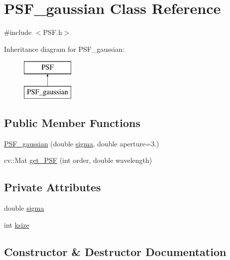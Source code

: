 \hypertarget{class_p_s_f__gaussian}{}\section{P\+S\+F\+\_\+gaussian Class Reference}
\label{class_p_s_f__gaussian}


{\ttfamily \#include $<$P\+S\+F.\+h$>$}

Inheritance diagram for P\+S\+F\+\_\+gaussian\+:\begin{figure}[H]
\begin{center}
\leavevmode
\includegraphics[height=2.000000cm]{class_p_s_f__gaussian}
\end{center}
\end{figure}
\subsection*{Public Member Functions}
\begin{DoxyCompactItemize}
\item 
\hyperlink{class_p_s_f__gaussian_a24935b42954caa3cb04b3926dc1f80e2}{P\+S\+F\+\_\+gaussian} (double \hyperlink{class_p_s_f__gaussian_ad0bcbd4165e73b7645f18906dd0d4aef}{sigma}, double aperture=3.)
\item 
cv\+::\+Mat \hyperlink{class_p_s_f__gaussian_a1f19bc740363485cd2e067f9580bafdd}{get\+\_\+\+P\+SF} (int order, double wavelength)
\end{DoxyCompactItemize}
\subsection*{Private Attributes}
\begin{DoxyCompactItemize}
\item 
double \hyperlink{class_p_s_f__gaussian_ad0bcbd4165e73b7645f18906dd0d4aef}{sigma}
\item 
int \hyperlink{class_p_s_f__gaussian_a553862ec78e59f6f36a67f9ddd50048c}{ksize}
\end{DoxyCompactItemize}


\subsection{Constructor \& Destructor Documentation}
